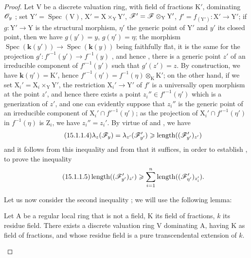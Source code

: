 \begin{proof}
Let $\mathrm{V}$ be a discrete valuation ring, with field of fractions $\mathrm{K}'$, dominating $\mathscr{O}_y$ ; set $\mathrm{Y}'=\operatorname{Spec}(\mathrm{V})$, $\mathrm{X}'=\mathrm{X}\times_\mathrm{Y}\mathrm{Y}'$, $\mathscr{F}'=\mathscr{F}\otimes_\mathrm{Y}\mathrm{Y}'$, $f'=f_{(\mathrm{Y}')}:\mathrm{X}'\to\mathrm{Y}'$; if $g:\mathrm{Y}'\to\mathrm{Y}$ is the structural morphism, $\eta'$ the generic point of $\mathrm{Y}'$ and $y'$ its closed point, then we have $g(y')=y$, $g(\eta')=\eta$; the morphism $\operatorname{Spec}(\mathbf{k}(y'))\to\operatorname{Spec}(\mathbf{k}(y))$ being faithfully flat, it is the same for the projection $g':f'^{-1}(y')\to f^{-1}(y)$ , and hence , there is a generic point $z'$ of an irreducible component of $f'^{-1}(y')$ such that $g'(z')=z$.
By construction, we have $\mathbf{k}(\eta')=\mathrm{K}'$, hence $f'^{-1}(\eta')=f^{-1}(\eta)\otimes_\mathrm{K}\mathrm{K}'$; on the other hand, if we set $\mathrm{X}_i'=\mathrm{X}_i\times_\mathrm{Y}\mathrm{Y}'$, the restriction $\mathrm{X}_i'\to\mathrm{Y}'$ of $f'$ is a universally open morphism at the point $z'$, and hence  there exists a point $z_i''\in f'^{-1}(\eta')$ which is a generization of $z'$, and one can evidently suppose that $z_i''$ is the generic point of an irreducible component of $\mathrm{X}_i'\cap f'^{-1}(\eta')$; as the projection of $\mathrm{X}_i'\cap f'^{-1}(\eta')$ in $f^{-1}(\eta)$ is $\mathrm{Z}_i$, we have $z_i''=z_i'$.
By virtue of  and , we have
\[
\tag{15.1.1.4}
\label{IV.15.1.1.4}
  \lambda_z(\mathscr{F}_y)=\lambda_{z'}(\mathscr{F}'_{y'})\geqslant\operatorname{length}((\mathscr{F}'_{y'})_{z'})
\]
and it follows from this inequality and from  that it suffices, in order to establish , to prove the inequality
\[
\tag{15.1.1.5}
\label{IV.15.1.1.5}
  \operatorname{length}((\mathscr{F}_{y'}')_{z'})\geqslant\sum_{i=1}^{n}\operatorname{length}((\mathscr{F}_{\eta'}')_{z_i'}).
\]

Let us now consider the second inequality ; we will use the following lemma:

\begin{lemma}[15.1.1.6]
\label{IV.15.1.1.6}
Let $\mathrm{A}$ be a regular local ring that is not a field, $\mathrm{K}$ its field of fractions, $k$ its residue field.
There exists a discrete valuation ring $\mathrm{V}$ dominating $\mathrm{A}$, having $\mathrm{K}$ as field of fractions, and whose residue field is a pure transcendental extension of $k$.
\end{lemma}


\end{proof}
